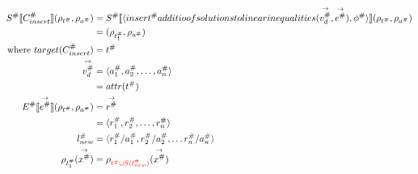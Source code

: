 \begin{align*}
    S^\# \llbracket C_{insert}^\# \rrbracket (\rho_{t^\#}, \rho_{a^\#})
                                               & = S^\# \llbracket \langle insert^\#additio of solutions to linear inequalities(\overset{\rightarrow}{v_d^\#}, \overset{\rightarrow}{e^\#}), \phi^\# \rangle \rrbracket (\rho_{t^\#}, \rho_{a^\#}) \\
                                               & = (\rho_{t_1^\#}, \rho_{a^\#})                                                                                                                         \\
    \text{where } target(C_{insert}^\#)        & = t^\#                                                                                                                                                 \\
    \overset{\rightarrow}{v_d^\#}              & = \langle a_1^\#, a_2^\#, \dots, a_n^\# \rangle                                                                                                        \\
                                               & = attr(t^\#)                                                                                                                                           \\
    E^\# \llbracket \overset{\rightarrow}{e^\#} \rrbracket (\rho_{t^\#}, \rho_{a^\#})
                                               & = \overset{\rightarrow}{r^\#}                                                                                                                          \\
                                               & = \langle r_1^\#, r_2^\#, \dots, r_n^\# \rangle                                                                                                        \\
    l_{new}^\#                                 & = \langle r_1^\#/a_1^\#, r_2^\#/a_2^\#, \dots r_n^\#/a_n^\# \rangle                                                                                    \\
    \rho_{t_1^\#}(\overset{\rightarrow}{x^\#}) & = \rho_{\textcolor{red}{t^\# \sqcup S(l_{new}^\#)}}(\overset{\rightarrow}{x^\#})
\end{align*}



